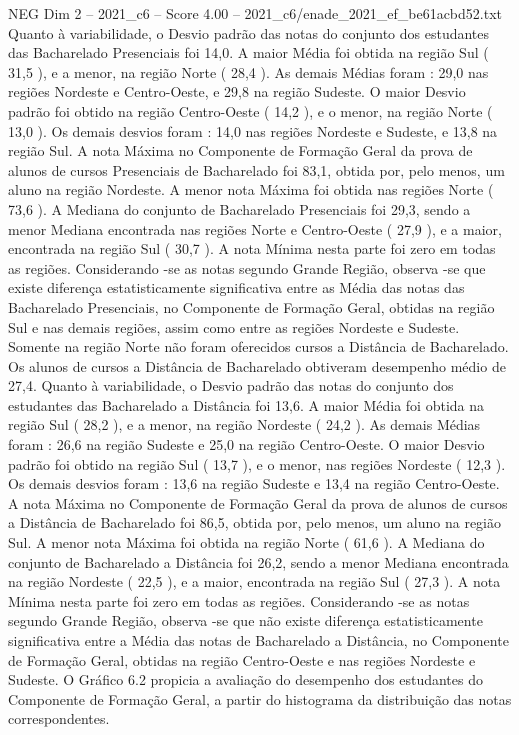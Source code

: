 \begin{textsample}{NEG Dim 2 – 2021\_c6 – Score 4.00 – 2021\_c6/enade\_2021\_ef\_be61acbd52.txt}
Quanto à variabilidade, o Desvio padrão das notas do conjunto dos estudantes das Bacharelado Presenciais foi 14,0.
A maior Média foi obtida na região Sul ( 31,5 ), e a menor, na região Norte ( 28,4 ).
As demais Médias foram : 29,0 nas regiões Nordeste e Centro-Oeste, e 29,8 na região Sudeste.
O maior Desvio padrão foi obtido na região Centro-Oeste ( 14,2 ), e o menor, na região Norte ( 13,0 ).
Os demais desvios foram : 14,0 nas regiões Nordeste e Sudeste, e 13,8 na região Sul.
A nota Máxima no Componente de Formação Geral da prova de alunos de cursos Presenciais de Bacharelado foi 83,1, obtida por, pelo menos, um aluno na região Nordeste.
A menor nota Máxima foi obtida nas regiões Norte ( 73,6 ).
A Mediana do conjunto de Bacharelado Presenciais foi 29,3, sendo a menor Mediana encontrada nas regiões Norte e Centro-Oeste ( 27,9 ), e a maior, encontrada na região Sul ( 30,7 ).
A nota Mínima nesta parte foi zero em todas as regiões.
Considerando -se as notas segundo Grande Região, observa -se que existe diferença estatisticamente significativa entre as Média das notas das Bacharelado Presenciais, no Componente de Formação Geral, obtidas na região Sul e nas demais regiões, assim como entre as regiões Nordeste e Sudeste.
Somente na região Norte não foram oferecidos cursos a Distância de Bacharelado.
Os alunos de cursos a Distância de Bacharelado obtiveram desempenho médio de 27,4.
Quanto à variabilidade, o Desvio padrão das notas do conjunto dos estudantes das Bacharelado a Distância foi 13,6.
A maior Média foi obtida na região Sul ( 28,2 ), e a menor, na região Nordeste ( 24,2 ).
As demais Médias foram : 26,6 na região Sudeste e 25,0 na região Centro-Oeste.
O maior Desvio padrão foi obtido na região Sul ( 13,7 ), e o menor, nas regiões Nordeste ( 12,3 ).
Os demais desvios foram : 13,6 na região Sudeste e 13,4 na região Centro-Oeste.
A nota Máxima no Componente de Formação Geral da prova de alunos de cursos a Distância de Bacharelado foi 86,5, obtida por, pelo menos, um aluno na região Sul.
A menor nota Máxima foi obtida na região Norte ( 61,6 ).
A Mediana do conjunto de Bacharelado a Distância foi 26,2, sendo a menor Mediana encontrada na região Nordeste ( 22,5 ), e a maior, encontrada na região Sul ( 27,3 ).
A nota Mínima nesta parte foi zero em todas as regiões.
Considerando -se as notas segundo Grande Região, observa -se que não existe diferença estatisticamente significativa entre a Média das notas de Bacharelado a Distância, no Componente de Formação Geral, obtidas na região Centro-Oeste e nas regiões Nordeste e Sudeste.
O Gráfico 6.2 propicia a avaliação do desempenho dos estudantes do Componente de Formação Geral, a partir do histograma da distribuição das notas correspondentes.

\end{textsample}

